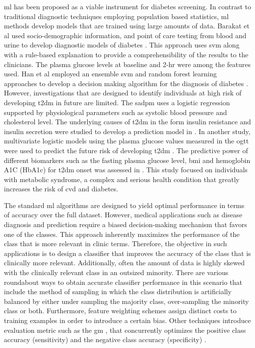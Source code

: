 \documentclass[journal,comsoc]{IEEEtran}
\renewcommand{\^}{\hat}  %
\begin{document}
\ac{ml} has been proposed as a viable instrument for diabetes screening. In contrast to traditional diagnostic techniques employing population based statistics, \ac{ml} methods develop models that are trained using large amounts of data. Barakat et al used socio-demographic information, and point of care testing from blood and urine to develop diagnostic models of diabetes \cite{barakat_intelligible_2010}. This approach uses \ac{svm} along with a rule-based explanation to provide a comprehensibility of the results to the clinicians. The plasma glucose levels at baseline and 2-hr were among the features used. Han et al employed an ensemble \ac{svm} and random forest learning approaches to develop a decision making algorithm for the diagnosis of diabetes \cite{han_rule_2015}. However, investigations that are designed to identify individuals at high risk of developing \ac{t2dm} in future are limited. The \ac{sadpm} \cite{stern2002identification} uses a logistic regression supported by physiological parameters such as systolic blood pressure and cholesterol level. The underlying causes of \ac{t2dm} in the form insulin resistance and insulin secretion were studied to develop a prediction model in \cite{abdul-ghani_what_2007}. In another study, multivariate logistic models using the plasma glucose values measured in the \ac{ogtt} were used to predict the future risk of developing \ac{t2dm} \cite{abdul-ghani_two-step_2011,abdul2009fasting}. The predictive power of different biomarkers such as the fasting plasma glucose level, \ac{bmi} and hemoglobin A1C (HbA1c) for \ac{t2dm} onset was assessed in \cite{Ozery-Flato2013}. This study focused on individuals with metabolic syndrome, a complex and serious health condition that greatly increases the risk of \ac{cvd} and diabetes.

The standard \ac{ml} algorithms are designed to yield optimal performance in terms of accuracy over the full dataset. However, medical applications such as disease diagnosis and prediction require a biased decision-making mechanism that favors one of the classes. This approach inherently maximizes the performance of the class that is more relevant in clinic terms. Therefore, the objective in such applications is to design a classifier that improves the accuracy of the class that is clinically more relevant. Additionally, often the amount of data is highly skewed with the clinically relevant class in an outsized minority. There are various roundabout ways to obtain accurate classifier performance in this scenario that include the method of sampling \cite{chawla2002smote} in which the class distribution is artificially balanced by either under sampling the majority class, over-sampling the minority class or both. Furthermore, feature weighting schemes assign distinct costs to training examples \cite{Domingos} in order to introduce a certain bias. Other techniques introduce evaluation metric such as the \ac{gm} \cite{kubat1997addressing}, that concurrently optimizes the positive class accuracy (sensitivity) and the negative class accuracy (specificity) \cite{Tang_SVM}.
\end{document}
